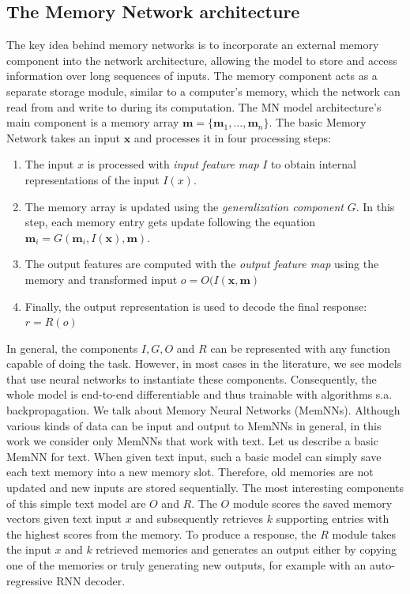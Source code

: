 \subsection{The Memory Network architecture}
The key idea behind memory networks is to incorporate an external memory component into the network architecture, allowing the model to store and access information over long sequences of inputs.
The memory component acts as a separate storage module, similar to a computer's memory, which the network can read from and write to during its computation.
The MN model architecture's main component is a memory array $\mathbf{m} = \{\mathbf{m}_1,...,\mathbf{m}_n\}$.
The basic Memory Network takes an input $\mathbf{x}$ and processes it in four processing steps:
\begin{enumerate}
    \item The input $x$ is processed with \emph{input feature map} $I$ to obtain internal representations of the input $I(x)$.
    \item The memory array is updated using the \emph{generalization component} $G$. In this step, each memory entry gets update following the equation $\mathbf{m}_i = G(\mathbf{m}_i, I(\mathbf{x}), \mathbf{m})$.
    \item The output features are computed with the \emph{output feature map} using the memory and transformed input $ o = O(I(\mathbf{x}, \mathbf{m})$
    \item Finally, the output representation is used to decode the final response: $r = R(o)$
\end{enumerate}

In general, the components $I, G, O$ and $R$ can be represented with any function capable of doing the task.
However, in most cases in the literature, we see models that use neural networks to instantiate these components.
Consequently, the whole model is end-to-end differentiable and thus trainable with algorithms s.a. backpropagation.
We talk about Memory Neural Networks (MemNNs).
Although various kinds of data can be input and output to MemNNs in general, in this work we consider only MemNNs that work with text.
Let us describe a basic MemNN for text.
When given text input, such a basic model can simply save each text memory into a new memory slot.
Therefore, old memories are not updated and new inputs are stored sequentially.
The most interesting components of this simple text model are $O$ and $R$.
The $O$ module scores the saved memory vectors given text input $x$ and subsequently retrieves $k$ supporting entries with the highest scores from the memory.
To produce a response, the $R$ module takes the input $x$ and $k$ retrieved memories and generates an output either by copying one of the memories or truly generating new outputs, for example with an auto-regressive RNN decoder. 

